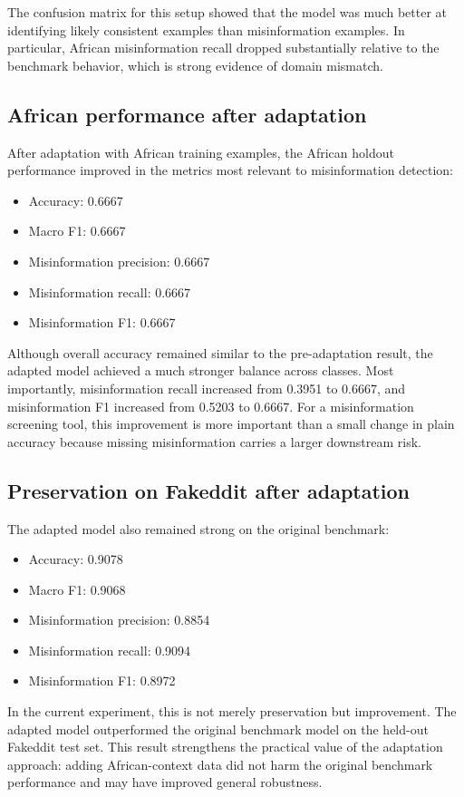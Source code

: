 \documentclass[a4paper,10.5pt,twoside]{article}
\begin{document}
The confusion matrix for this setup showed that the model was much better at identifying likely consistent examples than misinformation examples. In particular, African misinformation recall dropped substantially relative to the benchmark behavior, which is strong evidence of domain mismatch.

\subsection{African performance after adaptation}
After adaptation with African training examples, the African holdout performance improved in the metrics most relevant to misinformation detection:
\begin{itemize}[leftmargin=1.5em]
    \item Accuracy: 0.6667
    \item Macro F1: 0.6667
    \item Misinformation precision: 0.6667
    \item Misinformation recall: 0.6667
    \item Misinformation F1: 0.6667
\end{itemize}

Although overall accuracy remained similar to the pre-adaptation result, the adapted model achieved a much stronger balance across classes. Most importantly, misinformation recall increased from 0.3951 to 0.6667, and misinformation F1 increased from 0.5203 to 0.6667. For a misinformation screening tool, this improvement is more important than a small change in plain accuracy because missing misinformation carries a larger downstream risk.

\subsection{Preservation on Fakeddit after adaptation}
The adapted model also remained strong on the original benchmark:
\begin{itemize}[leftmargin=1.5em]
    \item Accuracy: 0.9078
    \item Macro F1: 0.9068
    \item Misinformation precision: 0.8854
    \item Misinformation recall: 0.9094
    \item Misinformation F1: 0.8972
\end{itemize}

In the current experiment, this is not merely preservation but improvement. The adapted model outperformed the original benchmark model on the held-out Fakeddit test set. This result strengthens the practical value of the adaptation approach: adding African-context data did not harm the original benchmark performance and may have improved general robustness.
\end{document}
